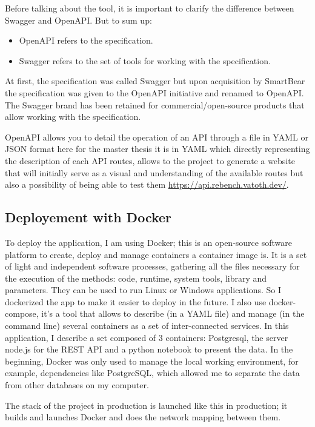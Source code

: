\documentclass{article}
\begin{document}
Before talking about the tool, it is important to clarify the difference between Swagger and OpenAPI. But to sum up:

\begin{itemize}
    \item OpenAPI refers to the specification.
    \item Swagger refers to the set of tools for working with the specification.
\end{itemize}

At first, the specification was called Swagger but upon acquisition by SmartBear the specification was given to the OpenAPI initiative and renamed to OpenAPI. The Swagger brand has been retained for commercial/open-source products that allow working with the specification.

OpenAPI allows you to detail the operation of an API through a file in YAML or JSON format here for the master thesis it is in YAML which directly representing the description of each API routes, allows to the project to generate a website that will initially serve as a visual and understanding of the available routes but also a possibility of being able to test them \url{https://api.rebench.vatoth.dev/}.



\subsection{Deployement with Docker}

To deploy the application, I am using Docker; this is an open-source software platform to create, deploy and manage containers a container image is. It is a set of light and independent software processes, gathering all the files necessary for the execution of the methods: code, runtime, system tools, library and parameters. They can be used to run Linux or Windows applications. So I dockerized the app to make it easier to deploy in the future. I also use docker-compose, it's a tool that allows to describe (in a YAML file) and manage (in the command line) several containers as a set of inter-connected services. In this application, I describe a set composed of 3 containers: Postgresql, the server node.js for the REST API and a python notebook to present the data. In the beginning, Docker was only used to manage the local working environment, for example, dependencies like PostgreSQL, which allowed me to separate the data from other databases on my computer.

The stack of the project in production is launched like this in production; it builds and launches Docker and does the network mapping between them.
\end{document}
